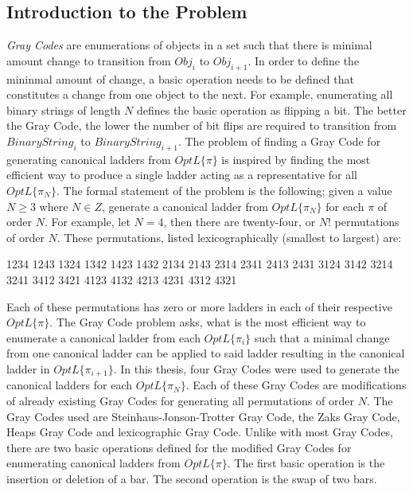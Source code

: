 \subsection{Introduction to the Problem}
\emph{Gray Codes} are enumerations of objects in a set such that there is 
minimal amount change to transition from $Obj_{i}$ to $Obj_{i+1}$. In order 
to define the mininmal amount of change, a basic operation needs to be defined that constitutes a change
from one object to the next. For example, enumerating all binary strings of length $N$ defines the basic 
operation as flipping a bit. The better the Gray Code, the lower the number of 
bit flips are required to transition from $BinaryString_{i}$ to $BinaryString_{i+1}$. 
The problem of finding a Gray Code for generating canonical ladders from $OptL\{\pi\}$ is inspired by finding the most efficient way to produce a 
single ladder acting as a  representative for all $OptL\{\pi_{N}\}$. The formal statement of the problem is the following; given a value 
$N\geq3$ where $N \in Z$, generate a canonical ladder from $OptL\{\pi_{N}\}$ for each $\pi$ of order $N$.
For example, let $N=4$, then there are twenty-four, or $N!$ permutations 
of order $N$. These permutations, listed lexicographically (smallest to largest)
are:

\begin{center}
\small{1234 1243}\newline
\small{1324 1342}\newline
\small{1423 1432}\newline
\small{2134 2143}\newline
\small{2314 2341}\newline
\small{2413 2431}\newline
\small{3124 3142}\newline
\small{3214 3241}\newline
\small{3412 3421}\newline
\small{4123 4132}\newline
\small{4213 4231}\newline
\small{4312 4321}\newline
\end{center}
Each of these permutations has zero or more ladders in each of their respective 
$OptL\{\pi\}$. The Gray Code problem asks, what is the most efficient way to enumerate 
a canonical ladder from each $OptL\{\pi_{i}\}$ such that a minimal change from 
one canonical ladder can be applied to said ladder resulting in the canonical 
ladder in $OptL\{\pi_{i+1}\}$. In this thesis, four Gray Codes were used to generate the canonical 
ladders for each $OptL\{\pi_{N}\}$. Each of these Gray Codes are modifications of already existing 
Gray Codes for generating all permutations of order $N$. The Gray Codes used 
are Steinhaus-Jonson-Trotter Gray Code, the Zaks Gray Code, Heaps Gray Code and lexicographic Gray Code.
Unlike with most Gray Codes, there are two basic operations defined for 
the modified Gray Codes for enumerating canonical ladders from $OptL\{\pi\}$.
The first basic operation is the insertion or deletion of a bar. The second 
operation is the swap of two bars. 

